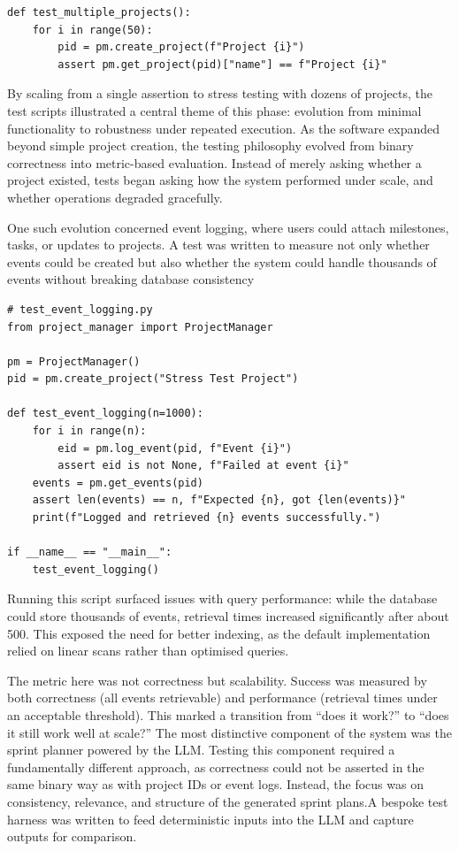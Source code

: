 \documentclass{report}
\begin{document}
\begin{lstlisting}
def test_multiple_projects():
    for i in range(50):
        pid = pm.create_project(f"Project {i}")
        assert pm.get_project(pid)["name"] == f"Project {i}"
\end{lstlisting}    
By scaling from a single assertion to stress testing with dozens of projects, the test scripts illustrated a central theme of this phase: evolution from minimal functionality to robustness under repeated execution.
As the software expanded beyond simple project creation, the testing philosophy evolved from binary correctness into metric-based evaluation. Instead of merely asking whether a project existed, tests began asking how the system performed under scale, and whether operations degraded gracefully.

One such evolution concerned event logging, where users could attach milestones, tasks, or updates to projects. A test was written to measure not only whether events could be created but also whether the system could handle thousands of events without breaking database consistency
\begin{lstlisting}
# test_event_logging.py
from project_manager import ProjectManager

pm = ProjectManager()
pid = pm.create_project("Stress Test Project")

def test_event_logging(n=1000):
    for i in range(n):
        eid = pm.log_event(pid, f"Event {i}")
        assert eid is not None, f"Failed at event {i}"
    events = pm.get_events(pid)
    assert len(events) == n, f"Expected {n}, got {len(events)}"
    print(f"Logged and retrieved {n} events successfully.")

if __name__ == "__main__":
    test_event_logging()
\end{lstlisting} 

Running this script surfaced issues with query performance: while the database could store thousands of events, retrieval times increased significantly after about 500. This exposed the need for better indexing, as the default implementation relied on linear scans rather than optimised queries.

The metric here was not correctness but scalability. Success was measured by both correctness (all events retrievable) and performance (retrieval times under an acceptable threshold). This marked a transition from “does it work?” to “does it still work well at scale?”
The most distinctive component of the system was the sprint planner powered by the LLM. Testing this component required a fundamentally different approach, as correctness could not be asserted in the same binary way as with project IDs or event logs. Instead, the focus was on consistency, relevance, and structure of the generated sprint plans.A bespoke test harness was written to feed deterministic inputs into the LLM and capture outputs for comparison.
\end{document}
